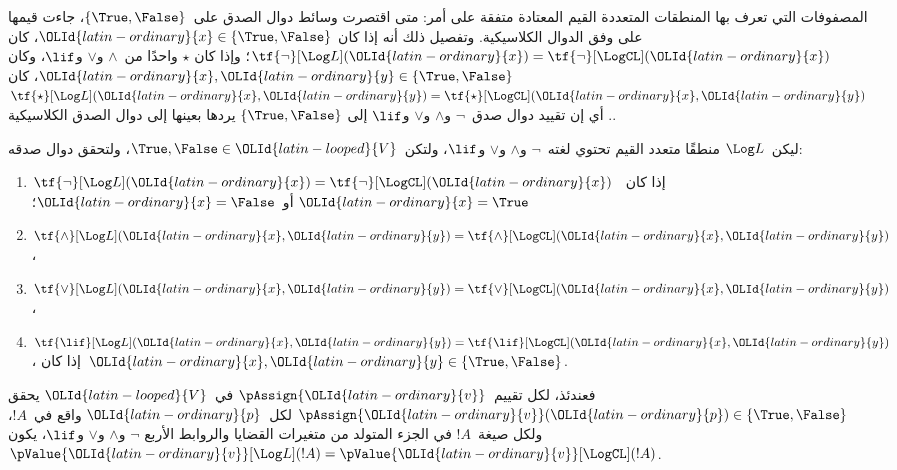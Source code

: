 \documentclass[../../../include/open-logic-section]{subfiles}
\begin{document}


المصفوفات التي تعرف بها المنطقات المتعددة القيم المعتادة متفقة على
أمر: متى اقتصرت وسائط دوال الصدق على~$\{\True, \False\}$، جاءت
قيمها على وفق الدوال الكلاسيكية. وتفصيل ذلك أنه إذا كان
${\OLId{latin-ordinary}{x}} \in \{\True, \False\}$، كان
$\tf{\lnot}[\Log L]({\OLId{latin-ordinary}{x}}) = \tf{\lnot}[\LogCL]({\OLId{latin-ordinary}{x}})$؛ وإذا كان
$\star$ واحدًا من~$\land$ و$\lor$ و$\lif$، وكان
${\OLId{latin-ordinary}{x}}, {\OLId{latin-ordinary}{y}} \in \{\True, \False\}$، كان
$\tf{\star}[\Log L]({\OLId{latin-ordinary}{x}},{\OLId{latin-ordinary}{y}}) = \tf{\star}[\LogCL]({\OLId{latin-ordinary}{x}},{\OLId{latin-ordinary}{y}})$. أي إن تقييد
دوال صدق~$\lnot$ و$\land$ و$\lor$ و$\lif$ إلى
$\{\True,\False\}$ يردها بعينها إلى دوال الصدق الكلاسيكية.

\begin{prop}
  ليكن~$\Log L$ منطقًا متعدد القيم تحتوي لغته~$\lnot$ و$\land$
  و$\lor$ و$\lif$، ولتكن~$\True, \False \in {\OLId{latin-looped}{V}}$، ولتحقق دوال صدقه:
  \begin{enumerate}
    \item{} $\tf{\lnot}[\Log L]({\OLId{latin-ordinary}{x}}) = \tf{\lnot}[\LogCL]({\OLId{latin-ordinary}{x}})$ إذا كان~${\OLId{latin-ordinary}{x}} =
    \True$ أو~${\OLId{latin-ordinary}{x}} = \False$؛
    \item{} $\tf{\land}[\Log L]({\OLId{latin-ordinary}{x}},{\OLId{latin-ordinary}{y}}) = \tf{\land}[\LogCL]({\OLId{latin-ordinary}{x}},{\OLId{latin-ordinary}{y}})$،
    \item{} $\tf{\lor}[\Log L]({\OLId{latin-ordinary}{x}},{\OLId{latin-ordinary}{y}}) = \tf{\lor}[\LogCL]({\OLId{latin-ordinary}{x}},{\OLId{latin-ordinary}{y}})$،
    \item{} $\tf{\lif}[\Log L]({\OLId{latin-ordinary}{x}},{\OLId{latin-ordinary}{y}}) = \tf{\lif}[\LogCL]({\OLId{latin-ordinary}{x}},{\OLId{latin-ordinary}{y}})$،
    إذا كان~${\OLId{latin-ordinary}{x}}, {\OLId{latin-ordinary}{y}} \in \{\True, \False\}$.
  \end{enumerate}
  فعندئذ، لكل تقييم~$\pAssign {\OLId{latin-ordinary}{v}}$ في~${\OLId{latin-looped}{V}}$ يحقق
  $\pAssign {\OLId{latin-ordinary}{v}}({\OLId{latin-ordinary}{p}}) \in \{\True,\False\}$ لكل~${\OLId{latin-ordinary}{p}}$ واقع في~$!A$، ولكل
  صيغة~$!A$ في الجزء المتولد من متغيرات القضايا والروابط الأربع
  $\lnot$ و$\land$ و$\lor$ و$\lif$، يكون
  $\pValue {\OLId{latin-ordinary}{v}}[\Log L](!A) = \pValue {\OLId{latin-ordinary}{v}}[\LogCL](!A)$.
\end{prop}
\end{document}
